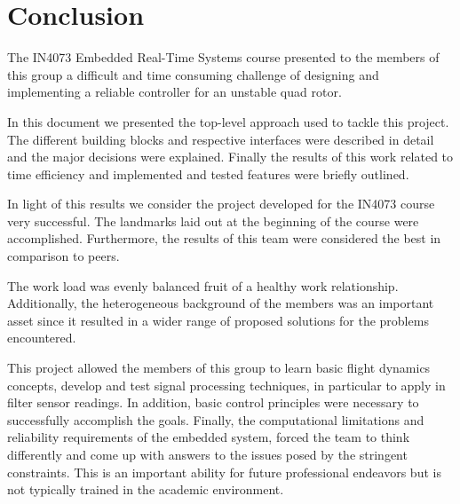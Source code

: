 \documentclass[11pt]{article}
\begin{document}
\section{Conclusion}
\label{sec:conclusion}


The IN4073 Embedded Real-Time Systems course presented to the members of this group a difficult and time consuming challenge of designing and implementing a reliable controller for an unstable quad rotor.

In this document we presented the top-level approach used to tackle this project. The different building blocks and respective interfaces were described in detail and the major decisions were explained. Finally the results of this work related to time efficiency and implemented and tested features were briefly outlined.

In light of this results we consider the project developed for the IN4073 course very successful.
The landmarks laid out at the beginning of the course were accomplished.
Furthermore, the results of this team were considered the best in comparison to peers.  

The work load was evenly balanced fruit of a healthy work relationship. Additionally, the heterogeneous background of the members was an important asset since it resulted in a wider range of proposed solutions for the problems encountered.

This project allowed the members of this group to learn basic flight dynamics concepts, develop and test signal processing techniques, in particular to apply in filter sensor readings. In addition, basic control principles were necessary to successfully accomplish the goals. Finally, the computational limitations and reliability requirements of the embedded system, forced the team to think differently and come up with answers to the issues posed by the stringent constraints. This is an important ability for future professional endeavors but is not typically trained in the academic environment. 
\end{document}
